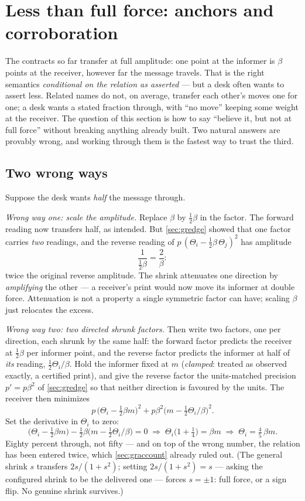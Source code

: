 \section{Less than full force: anchors and corroboration}
\label{sec:granchor}

The contracts so far transfer at full amplitude: one point at the
informer is $\beta$ points at the receiver, however far the message
travels.  That is the right semantics \emph{conditional on the
relation as asserted} --- but a desk often wants to assert less.
Related names do not, on average, transfer each other's moves one for
one; a desk wants a stated fraction through, with
``no move'' keeping some weight at the receiver.  The question of this
section is how to say ``believe it, but not at full force'' without
breaking anything already built.  Two natural answers are provably
wrong, and working through them is the fastest way to trust the third.

\subsection{Two wrong ways}

Suppose the desk wants \emph{half} the message through.

\emph{Wrong way one: scale the amplitude.}  Replace $\beta$ by
$\tfrac12\beta$ in the factor.  The forward reading now transfers
half, as intended.  But \cref{sec:gredge} showed that one factor
carries \emph{two} readings, and the reverse reading of
$p\,(\Theta_i-\tfrac12\beta\,\Theta_j)^{2}$ has amplitude
\[
\frac{1}{\tfrac12\beta}=\frac{2}{\beta}:
\]
twice the original reverse amplitude.  The shrink attenuates one
direction by \emph{amplifying} the other --- a receiver's print would
now move its informer at double force.  Attenuation is not a property
a single symmetric factor can have; scaling $\beta$ just relocates
the excess.

\emph{Wrong way two: two directed shrunk factors.}  Then write two
factors, one per direction, each shrunk by the same half: the forward
factor predicts the receiver at $\tfrac12\beta$ per informer point,
and the reverse factor predicts the informer at half of
\emph{its} reading, $\tfrac12\Theta_i/\beta$.  Hold the informer
fixed at $m$ (\emph{clamped}: treated as observed exactly, a
certified print), and give the reverse factor the units-matched
precision $p'=p\beta^{2}$ of \cref{sec:gredge} so that neither
direction is favoured by the units.  The receiver then minimizes
\[
p\,\bigl(\Theta_i-\tfrac12\beta m\bigr)^{2}
+p\beta^{2}\bigl(m-\tfrac12\Theta_i/\beta\bigr)^{2}.
\]
Set the derivative in $\Theta_i$ to zero:
\[
\bigl(\Theta_i-\tfrac12\beta m\bigr)
-\tfrac12\beta\bigl(m-\tfrac12\Theta_i/\beta\bigr)=0
\;\Longrightarrow\;
\Theta_i\bigl(1+\tfrac14\bigr)=\beta m
\;\Longrightarrow\;
\Theta_i=\tfrac{4}{5}\,\beta m .
\]
Eighty percent through, not fifty --- and on top of the wrong number,
the relation has been entered twice, which \cref{sec:graccount}
already ruled out.  (The general shrink $s$ transfers
$2s/(1+s^{2})$; setting $2s/(1+s^{2})=s$ --- asking the configured
shrink to be the delivered one --- forces $s=\pm1$: full force, or a
sign flip.  No genuine shrink survives.)

